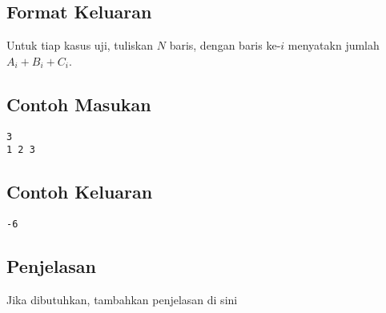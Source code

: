 \documentclass{article}
\begin{document}
\subsection*{Format Keluaran}

Untuk tiap kasus uji, tuliskan $N$ baris, dengan baris ke-$i$ menyatakn jumlah $A_i + B_i + C_i$.
\\

\begin{multicols}{2}
\subsection*{Contoh Masukan}
\begin{lstlisting}
3
1 2 3
\end{lstlisting}
\columnbreak
\subsection*{Contoh Keluaran}
\begin{lstlisting}
-6
\end{lstlisting}
\vfill
\null
\end{multicols}

\subsection*{Penjelasan}
 Jika dibutuhkan, tambahkan penjelasan di sini

\pagebreak
\end{document}
